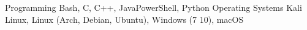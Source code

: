 

\begin{cvskills}

  \cvskill
    {Programming} %
    {Bash, C, C++, JavaPowerShell, Python} %
  \cvskill
    {Operating Systems} %
    {Kali Linux, Linux (Arch, Debian, Ubuntu), Windows (7 10), macOS} %

\end{cvskills}
